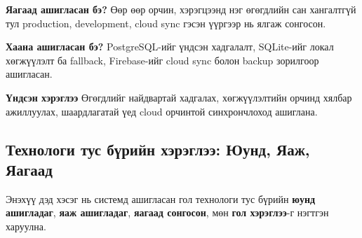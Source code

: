 \documentclass[12pt,a4paper]{report}
\begin{document}
\textbf{Яагаад ашигласан бэ?} Өөр өөр орчин, хэрэгцээнд нэг өгөгдлийн сан хангалтгүй тул production, development, cloud sync гэсэн үүргээр нь ялгаж сонгосон.

\textbf{Хаана ашигласан бэ?} PostgreSQL-ийг үндсэн хадгалалт, SQLite-ийг локал хөгжүүлэлт ба fallback, Firebase-ийг cloud sync болон backup зорилгоор ашигласан.

\textbf{Үндсэн хэрэглээ} Өгөгдлийг найдвартай хадгалах, хөгжүүлэлтийн орчинд хялбар ажиллуулах, шаардлагатай үед cloud орчинтой синхрончлоход ашиглана.

\subsection{Технологи тус бүрийн хэрэглээ: Юунд, Яаж, Яагаад}

Энэхүү дэд хэсэг нь системд ашигласан гол технологи тус бүрийн \textbf{юунд ашигладаг}, \textbf{яаж ашигладаг}, \textbf{яагаад сонгосон}, мөн \textbf{гол хэрэглээ}-г нэгтгэн харуулна.
\end{document}

